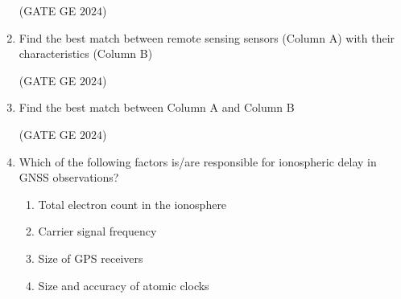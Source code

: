 \documentclass[journal,12pt,onecolumn]{IEEEtran}
\theoremstyle{remark}
\begin{document}
\begin{enumerate}
\begin{enumerate}
\end{enumerate}
\hfill{(GATE GE $2024$)}
\bigskip
\item Find the best match between remote sensing sensors (Column A) with their characteristics (Column B)
\begin{table}[h]
    \centering
    
\end{table}
\begin{enumerate}
\end{enumerate}
\hfill{(GATE GE $2024$)}
\bigskip
\item Find the best match between Column A and Column B
\begin{table}[h]
    \centering
    
\end{table}
\begin{enumerate}
\end{enumerate}
\hfill{(GATE GE $2024$)}
\bigskip
\item Which of the following factors is/are responsible for ionospheric delay in GNSS observations?
\begin{enumerate}
\item Total electron count in the ionosphere
\item Carrier signal frequency
\item Size of GPS receivers
\item Size and accuracy of atomic clocks

\end{enumerate}
\end{enumerate}
\end{document}
